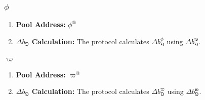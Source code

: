 \documentclass[class=article, crop=false]{standalone}
\begin{document}

\subsubsection{$\phi$}

\begin{enumerate}
    \item \textbf{Pool Address:} $\phi^{@}$
    \item \textbf{$\Delta b_{\Game}$ Calculation:} The protocol calculates $\Delta b_{\Game}^{\phi}$ using $\Delta b_{\Game}^{\mathfrak{w}}$.
\end{enumerate}


\subsubsection{$\varpi$}

\begin{enumerate}
    \item \textbf{Pool Address:} $\varpi^{@}$
    \item \textbf{$\Delta b_{\Game}$ Calculation:} The protocol calculates $\Delta b_{\Game}^{\varpi}$ using $\Delta b_{\Game}^{\mathfrak{w}}$.
\end{enumerate}
\end{document}
